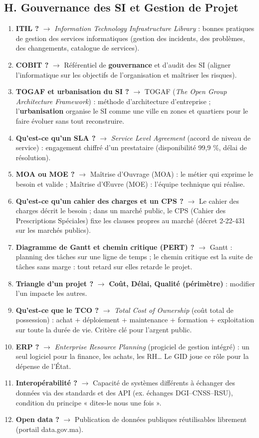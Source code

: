 \subsection*{H. Gouvernance des SI et Gestion de Projet}
\begin{enumerate}[leftmargin=*]
    \item \textbf{ITIL ?} $\rightarrow$ \textit{Information Technology Infrastructure Library} : bonnes pratiques de gestion des services informatiques (gestion des incidents, des problèmes, des changements, catalogue de services).
    \item \textbf{COBIT ?} $\rightarrow$ Référentiel de \textbf{gouvernance} et d'audit des SI (aligner l'informatique sur les objectifs de l'organisation et maîtriser les risques).
    \item \textbf{TOGAF et urbanisation du SI ?} $\rightarrow$ TOGAF (\textit{The Open Group Architecture Framework}) : méthode d'architecture d'entreprise ; l'\textbf{urbanisation} organise le SI comme une ville en zones et quartiers pour le faire évoluer sans tout reconstruire.
    \item \textbf{Qu'est-ce qu'un SLA ?} $\rightarrow$ \textit{Service Level Agreement} (accord de niveau de service) : engagement chiffré d'un prestataire (disponibilité 99,9 \%, délai de résolution).
    \item \textbf{MOA ou MOE ?} $\rightarrow$ Maîtrise d'Ouvrage (MOA) : le métier qui exprime le besoin et valide ; Maîtrise d'Œuvre (MOE) : l'équipe technique qui réalise.
    \item \textbf{Qu'est-ce qu'un cahier des charges et un CPS ?} $\rightarrow$ Le cahier des charges décrit le besoin ; dans un marché public, le CPS (Cahier des Prescriptions Spéciales) fixe les clauses propres au marché (décret 2-22-431 sur les marchés publics).
    \item \textbf{Diagramme de Gantt et chemin critique (PERT) ?} $\rightarrow$ Gantt : planning des tâches sur une ligne de temps ; le chemin critique est la suite de tâches sans marge : tout retard sur elles retarde le projet.
    \item \textbf{Triangle d'un projet ?} $\rightarrow$ \textbf{Coût, Délai, Qualité (périmètre)} : modifier l'un impacte les autres.
    \item \textbf{Qu'est-ce que le TCO ?} $\rightarrow$ \textit{Total Cost of Ownership} (coût total de possession) : achat + déploiement + maintenance + formation + exploitation sur toute la durée de vie. Critère clé pour l'argent public.
    \item \textbf{ERP ?} $\rightarrow$ \textit{Enterprise Resource Planning} (progiciel de gestion intégré) : un seul logiciel pour la finance, les achats, les RH\ldots{} Le GID joue ce rôle pour la dépense de l'État.
    \item \textbf{Interopérabilité ?} $\rightarrow$ Capacité de systèmes différents à échanger des données via des standards et des API (ex. échanges DGI–CNSS–RSU), condition du principe « dites-le nous une fois ».
    \item \textbf{Open data ?} $\rightarrow$ Publication de données publiques réutilisables librement (portail data.gov.ma).
\end{enumerate}

